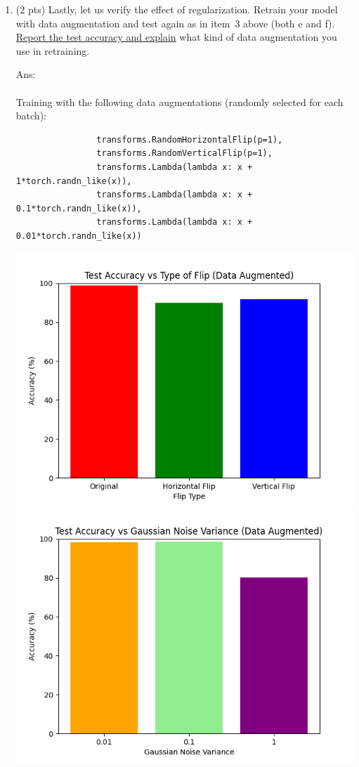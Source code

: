 \documentclass[10pt]{article}
\newcommand{\ans}[1]{{\color{blue}\textsf{Ans}: #1}}
\begin{document}
\begin{exercise}
\begin{enumerate}
		\item (2 pts) Lastly, let us verify the effect of regularization. Retrain your model with data augmentation and test again as in item~3 above (both e and f). \uline{Report the test accuracy and explain} what kind of data augmentation you use in retraining.

		      \ans\\
		      \leavevmode\\
		      Training with the following data augmentations (randomly selected for each batch):
		      \begin{verbatim}
				transforms.RandomHorizontalFlip(p=1),
				transforms.RandomVerticalFlip(p=1),
				transforms.Lambda(lambda x: x + 1*torch.randn_like(x)),
				transforms.Lambda(lambda x: x + 0.1*torch.randn_like(x)),
				transforms.Lambda(lambda x: x + 0.01*torch.randn_like(x))
			\end{verbatim}
		      \begin{center}
			      \includegraphics[width=.4\textwidth]{plots_retrained/accuracy_vs_flip.png}	\includegraphics[width=.4\textwidth]{plots_retrained/accuracy_vs_noise.png}
		      \end{center}
	\end{enumerate}
\end{exercise}
\end{document}
